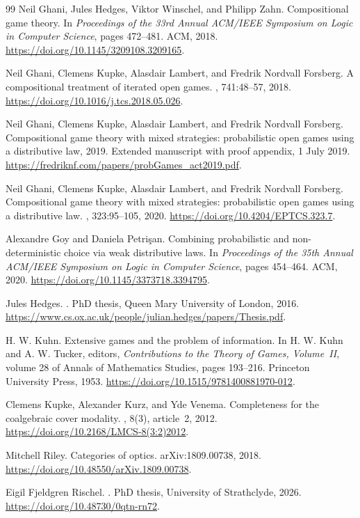 \documentclass[11pt,a4paper]{article}
\theoremstyle{definition}
\begin{document}
\begin{thebibliography}{99}
    Neil Ghani, Jules Hedges, Viktor Winschel, and Philipp Zahn. \newblock Compositional game theory. \newblock In {\em Proceedings of the 33rd Annual ACM/IEEE Symposium on Logic in Computer Science}, pages 472--481. ACM, 2018. \newblock \url{https://doi.org/10.1145/3209108.3209165}.

    Neil Ghani, Clemens Kupke, Alasdair Lambert, and Fredrik {Nordvall Forsberg}. \newblock A compositional treatment of iterated open games. , 741:48--57, 2018. \newblock \url{https://doi.org/10.1016/j.tcs.2018.05.026}.

    Neil Ghani, Clemens Kupke, Alasdair Lambert, and Fredrik {Nordvall Forsberg}. \newblock Compositional game theory with mixed strategies: probabilistic open games using a distributive law, 2019. \newblock Extended manuscript with proof appendix, 1 July 2019. \url{https://fredriknf.com/papers/probGames_act2019.pdf}.

    Neil Ghani, Clemens Kupke, Alasdair Lambert, and Fredrik {Nordvall Forsberg}. \newblock Compositional game theory with mixed strategies: probabilistic open games using a distributive law. , 323:95--105, 2020. \newblock \url{https://doi.org/10.4204/EPTCS.323.7}.

    Alexandre Goy and Daniela Petri{\c{s}}an. \newblock Combining probabilistic and non-deterministic choice via weak distributive laws. \newblock In {\em Proceedings of the 35th Annual ACM/IEEE Symposium on Logic in Computer Science}, pages 454--464. ACM, 2020. \newblock \url{https://doi.org/10.1145/3373718.3394795}.

    Jules Hedges. . \newblock PhD thesis, Queen Mary University of London, 2016. \newblock \url{https://www.cs.ox.ac.uk/people/julian.hedges/papers/Thesis.pdf}.

    H. W. Kuhn. \newblock Extensive games and the problem of information. \newblock In H. W. Kuhn and A. W. Tucker, editors, {\em Contributions to the Theory of Games, Volume~II}, volume 28 of Annals of Mathematics Studies, pages 193--216. Princeton University Press, 1953. \newblock \url{https://doi.org/10.1515/9781400881970-012}.

    Clemens Kupke, Alexander Kurz, and Yde Venema. \newblock Completeness for the coalgebraic cover modality. , 8(3), article~2, 2012. \newblock \url{https://doi.org/10.2168/LMCS-8(3:2)2012}.

    Mitchell Riley. \newblock Categories of optics. \newblock arXiv:1809.00738, 2018. \newblock \url{https://doi.org/10.48550/arXiv.1809.00738}.

    Eigil Fjeldgren Rischel. . \newblock PhD thesis, University of Strathclyde, 2026. \newblock \url{https://doi.org/10.48730/0qtn-rn72}.

\end{thebibliography}
\end{document}
